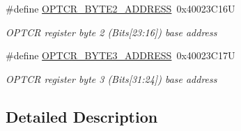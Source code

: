 \begin{DoxyCompactItemize}
\begin{DoxyCompactList}
 \end{DoxyCompactList}\item 
\mbox{\label{group___f_l_a_s_h___private___constants_ga600e8029b876676da246a62924a294c7}} 
\#define \mbox{\hyperlink{group___f_l_a_s_h___private___constants_ga600e8029b876676da246a62924a294c7}{O\+P\+T\+C\+R\+\_\+\+B\+Y\+T\+E2\+\_\+\+A\+D\+D\+R\+E\+SS}}~0x40023\+C16U
\begin{DoxyCompactList}\small\item\em O\+P\+T\+CR register byte 2 (Bits\mbox{[}23\+:16\mbox{]}) base address ~\newline
 \end{DoxyCompactList}\item 
\mbox{\label{group___f_l_a_s_h___private___constants_gab0cdb1b585010a65ca09ecf67055fb94}} 
\#define \mbox{\hyperlink{group___f_l_a_s_h___private___constants_gab0cdb1b585010a65ca09ecf67055fb94}{O\+P\+T\+C\+R\+\_\+\+B\+Y\+T\+E3\+\_\+\+A\+D\+D\+R\+E\+SS}}~0x40023\+C17U
\begin{DoxyCompactList}\small\item\em O\+P\+T\+CR register byte 3 (Bits\mbox{[}31\+:24\mbox{]}) base address ~\newline
 \end{DoxyCompactList}\end{DoxyCompactItemize}


\subsection{Detailed Description}
